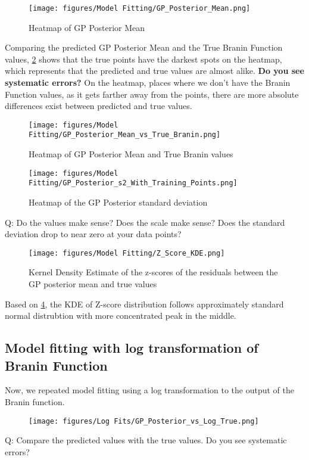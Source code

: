 \documentclass[11pt]{article}
\numberwithin{equation}{section}
\begin{document}
\begin{figure}[H]
  \centering
  \texttt{[image: figures/Model Fitting/GP\_Posterior\_Mean.png]}
  \caption{Heatmap of GP Posterior Mean}
  \label{fig:gp_post_mean_heatmap}
\end{figure}

Comparing the predicted GP Posterior Mean and the True Branin Function values, \ref{fig:gp_postmean_and_trueval} shows that the true points have the darkest spots on the heatmap, which represents that the predicted and true values are almost alike. \textbf{Do you see systematic errors?} On the heatmap, places where we don't have the Branin Function values, as it gets farther away from the points, there are more absolute differences exist between predicted and true values.

\begin{figure}[H]
  \centering
  \texttt{[image: figures/Model Fitting/GP\_Posterior\_Mean\_vs\_True\_Branin.png]}
  \caption{Heatmap of GP Posterior Mean and True Branin values}
  \label{fig:gp_postmean_and_trueval}
\end{figure}


\begin{figure}[H]
  \centering
  \texttt{[image: figures/Model Fitting/GP\_Posterior\_s2\_With\_Training\_Points.png]}
  \caption{Heatmap of the GP Posterior standard deviation}
  \label{fig:gp_post_std}
\end{figure}
Q: Do the values make sense? Does the scale make sense? Does the standard
deviation drop to near zero at your data points?

\begin{figure}[H]
  \centering
  \texttt{[image: figures/Model Fitting/Z\_Score\_KDE.png]}
  \caption{Kernel Density Estimate of the z-scores of the residuals between the GP posterior mean and true values}
  \label{fig:zscore_kde}
\end{figure}
Based on \ref{fig:zscore_kde}, the KDE of Z-score distribution follows approximately standard normal distrubtion with more concentrated peak in the middle.

\subsection*{Model fitting with log transformation of Branin Function}
Now, we repeated model fitting using a log transformation to the output of the Branin function.


\begin{figure}[H]
  \centering
  \texttt{[image: figures/Log Fits/GP\_Posterior\_vs\_Log\_True.png]}
  \caption{}
  \label{}
\end{figure}
Q: Compare
the predicted values with the true values. Do you see systematic errors?
\end{document}
